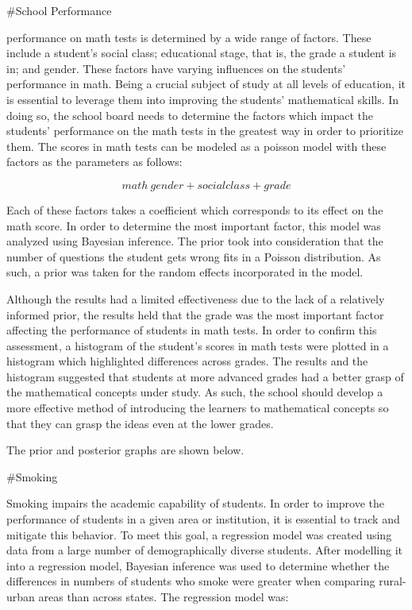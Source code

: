 \documentclass[
  12pt,
]{article}
\author{}
\date{\vspace{-2.5em}}
\begin{document}
\#School Performance

performance on math tests is determined by a wide range of factors.
These include a student's social class; educational stage, that is, the
grade a student is in; and gender. These factors have varying influences
on the students' performance in math. Being a crucial subject of study
at all levels of education, it is essential to leverage them into
improving the students' mathematical skills. In doing so, the school
board needs to determine the factors which impact the students'
performance on the math tests in the greatest way in order to prioritize
them. The scores in math tests can be modeled as a poisson model with
these factors as the parameters as follows:

\[ math ~ gender + socialclass + grade\]

Each of these factors takes a coefficient which corresponds to its
effect on the math score. In order to determine the most important
factor, this model was analyzed using Bayesian inference. The prior took
into consideration that the number of questions the student gets wrong
fits in a Poisson distribution. As such, a prior was taken for the
random effects incorporated in the model.

Although the results had a limited effectiveness due to the lack of a
relatively informed prior, the results held that the grade was the most
important factor affecting the performance of students in math tests. In
order to confirm this assessment, a histogram of the student's scores in
math tests were plotted in a histogram which highlighted differences
across grades. The results and the histogram suggested that students at
more advanced grades had a better grasp of the mathematical concepts
under study. As such, the school should develop a more effective method
of introducing the learners to mathematical concepts so that they can
grasp the ideas even at the lower grades.

The prior and posterior graphs are shown below.

\#Smoking

Smoking impairs the academic capability of students. In order to improve
the performance of students in a given area or institution, it is
essential to track and mitigate this behavior. To meet this goal, a
regression model was created using data from a large number of
demographically diverse students. After modelling it into a regression
model, Bayesian inference was used to determine whether the differences
in numbers of students who smoke were greater when comparing rural-urban
areas than across states. The regression model was:
\end{document}
